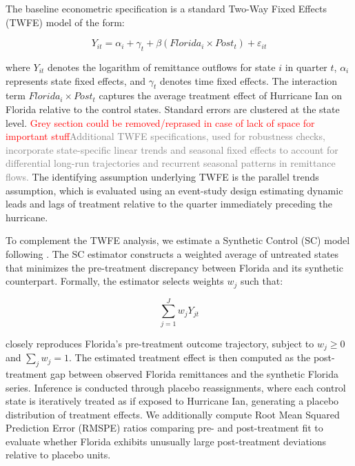 The baseline econometric specification is a standard Two-Way Fixed Effects (TWFE) model of the form:

\begin{equation}
Y_{it} = \alpha_i + \gamma_t + \beta (Florida_i \times Post_t) + \varepsilon_{it}
\end{equation}

where \(Y_{it}\) denotes the logarithm of remittance outflows for state \(i\) in quarter \(t\), \(\alpha_i\) represents state fixed effects, and \(\gamma_t\) denotes time fixed effects. The interaction term \(Florida_i \times Post_t\) captures the average treatment effect of Hurricane Ian on Florida relative to the control states. Standard errors are clustered at the state level. \textcolor{red}{Grey section could be removed/reprased in case of lack of space for important stuff}\textcolor{grey}{Additional TWFE specifications, used for robustness checks, incorporate state-specific linear trends and seasonal fixed effects to account for differential long-run trajectories and recurrent seasonal patterns in remittance flows.} The identifying assumption underlying TWFE is the parallel trends assumption, which is evaluated using an event-study design estimating dynamic leads and lags of treatment relative to the quarter immediately preceding the hurricane.

To complement the TWFE analysis, we estimate a Synthetic Control (SC) model following \textcite{abadie2010synthetic}. The SC estimator constructs a weighted average of untreated states that minimizes the pre-treatment discrepancy between Florida and its synthetic counterpart. Formally, the estimator selects weights \(w_j\) such that:

\begin{equation}
\sum_{j=1}^{J} w_j Y_{jt}
\end{equation}

closely reproduces Florida’s pre-treatment outcome trajectory, subject to \(w_j \geq 0\) and \(\sum_j w_j = 1\). The estimated treatment effect is then computed as the post-treatment gap between observed Florida remittances and the synthetic Florida series. Inference is conducted through placebo reassignments, where each control state is iteratively treated as if exposed to Hurricane Ian, generating a placebo distribution of treatment effects. We additionally compute Root Mean Squared Prediction Error (RMSPE) ratios comparing pre- and post-treatment fit to evaluate whether Florida exhibits unusually large post-treatment deviations relative to placebo units.

